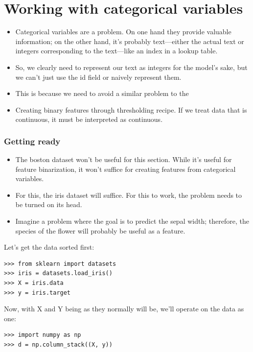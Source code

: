 \documentclass[SKL-MASTER.tex]{subfiles}
\begin{document}
\section*{Working with categorical variables}
\begin{itemize}
\item Categorical variables are a problem. On one hand they provide valuable information; on the
other hand, it's probably text—either the actual text or integers corresponding to the text—like
an index in a lookup table.
\item So, we clearly need to represent our text as integers for the model's sake, but we can't just use
the id field or naively represent them. 
\item This is because we need to avoid a similar problem to the
\item Creating binary features through thresholding recipe. If we treat data that is continuous, it must
be interpreted as continuous.
\end{itemize}
\subsubsection*{Getting ready}
\begin{itemize}
\item 
The boston dataset won't be useful for this section. While it's useful for feature binarization,
it won't suffice for creating features from categorical variables.
\item For this, the iris dataset
will suffice.
For this to work, the problem needs to be turned on its head. 
\item Imagine a problem where the
goal is to predict the sepal width; therefore, the species of the flower will probably be useful
as a feature.
\end{itemize}
Let's get the data sorted first:

\begin{framed}
\begin{verbatim}
>>> from sklearn import datasets
>>> iris = datasets.load_iris()
>>> X = iris.data
>>> y = iris.target
\end{verbatim}
\end{framed}
Now, with X and Y being as they normally will be, we'll operate on the data as one:
\begin{framed}
\begin{verbatim}
>>> import numpy as np
>>> d = np.column_stack((X, y))
\end{verbatim}
\end{framed}
\end{document}
